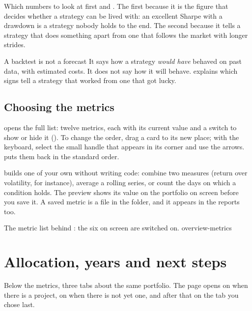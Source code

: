 \begin{perche}{Which numbers to look at first}
 and . The first because it is the
figure that decides whether a strategy can be lived with: an excellent Sharpe
with a  drawdown is a strategy nobody holds to the end. The
second because it tells a strategy that does something apart from one that
follows the market with longer strides.
\end{perche}

\begin{attenzione}{A backtest is not a forecast}
It says how a strategy \emph{would have} behaved on past data, with
estimated costs. It does not say how it will behave. 
explains which signs tell a strategy that worked from one that got lucky.
\end{attenzione}

\subsection{Choosing the metrics}

 opens the full list: twelve metrics, each with its
current value and a switch to show or hide it ().
To change the order, drag a card to its new place; with the keyboard, select
the small handle that appears in its corner and use the arrows.
 puts them back in the standard order.

 builds one of your own without writing code: combine
two measures (return over volatility, for instance), average a rolling
series, or count the days on which a condition holds. The preview shows its
value on the portfolio on screen before you save it. A saved metric is a
file in the  folder, and it appears in the reports too.

  {The metric list behind : the six on screen are
   switched on.}
  {overview-metrics}

\section{Allocation, years and next steps}\label{sez:overview-tabs}

Below the metrics, three tabs about the same portfolio. The page opens on
 when there is a project, on  when there is
not yet one, and after that on the tab you chose last.

